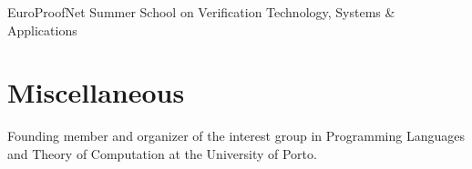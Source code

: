 \documentclass[11pt,a4paper]{moderncv}
\begin{document}
\begin{description}[labelwidth=60pt,align=right,leftmargin=!]
    \item[\normalfont{\emph{2023}}]
        EuroProofNet Summer School on Verification Technology, Systems \& Applications
\end{description}

\section{Miscellaneous}

\begin{description}[labelwidth=60pt,align=right,leftmargin=!]
    \item[PLC] Founding member and organizer of the interest group in Programming Languages and Theory of Computation at the University of Porto.
\end{description}
\end{document}
